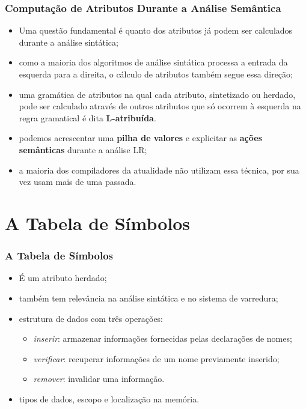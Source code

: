 \documentclass[table]{beamer}
\begin{document}
\begin{frame}
   \frametitle{Computação de Atributos Durante a Análise Semântica}
   \begin{itemize}
      \item Uma questão fundamental é quanto dos atributos já podem ser calculados durante a análise sintática;
      \item como a maioria dos algoritmos de análise sintática processa a entrada da esquerda para a direita, o cálculo de atributos também segue essa direção;
      \item uma gramática de atributos na qual cada atributo, sintetizado ou herdado, pode ser calculado através de outros atributos que só ocorrem à esquerda na regra gramatical é dita \textbf{L-atribuída}.
      \item podemos acrescentar uma \textbf{pilha de valores} e explicitar as \textbf{ações semânticas} durante a análise LR;
      \item a maioria dos compiladores da atualidade não utilizam essa técnica, por sua vez usam mais de uma passada.
   \end{itemize}
\end{frame}

\section{A Tabela de Símbolos}
\begin{frame}
   \frametitle{A Tabela de Símbolos}
   \begin{itemize}
      \item É um atributo herdado;
      \item também tem relevância na análise sintática e no sistema de varredura;
      \item estrutura de dados com três operações:
      \begin{itemize}
         \item \textit{inserir}: armazenar informações fornecidas pelas declarações de nomes;
	 \item \textit{verificar}: recuperar informações de um nome previamente inserido;
	 \item \textit{remover}: invalidar uma informação.
      \end{itemize}
      \item tipos de dados, escopo e localização na memória.
   \end{itemize}
\end{frame}
\end{document}

